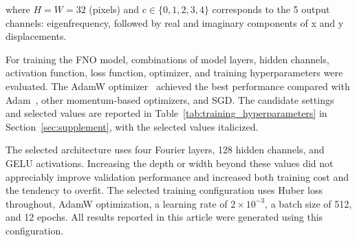 \documentclass[preprint,review,12pt,numafflabel]{elsarticle}
\begin{document}

where $H = W = 32$ (pixels) and $c \in \{0,1,2,3,4\}$ corresponds to the 5 output channels: eigenfrequency, followed by real and imaginary components of x and y displacements.

For training the FNO model, combinations of model layers, hidden channels, activation function, loss function, optimizer, and training hyperparameters were evaluated. The AdamW optimizer~\cite{loshchilov2019adamw} achieved the best performance compared with Adam~\cite{kingma2015adam}, other momentum-based optimizers, and SGD. The candidate settings and selected values are reported in Table~\ref{tab:training_hyperparameters} in Section~\ref{sec:supplement}, with the selected values italicized.




The selected architecture uses four Fourier layers, 128 hidden channels, and GELU activations. Increasing the depth or width beyond these values did not appreciably improve validation performance and increased both training cost and the tendency to overfit. The selected training configuration uses Huber loss throughout, AdamW optimization, a learning rate of $2\times10^{-3}$, a batch size of 512, and 12 epochs. All results reported in this article were generated using this configuration.
\end{document}
